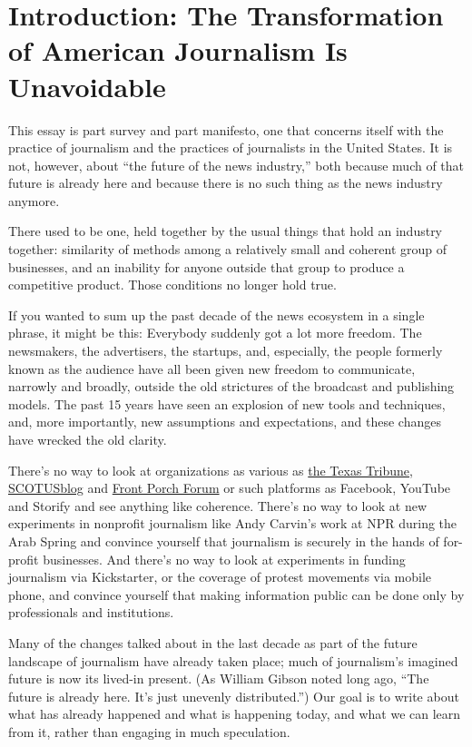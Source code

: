 \chapter{Introduction: The Transformation of American Journalism Is Unavoidable}

This essay is part survey and part manifesto, one that concerns itself with the practice
of journalism and the practices of journalists in the United States. It is not,
however, about ``the future of the news industry,'' both because much of that future
is already here and because there is no such thing as the news industry anymore.

There used to be one, held together by the usual things that hold an industry
together: similarity of methods among a relatively small and coherent group of
businesses, and an inability for anyone outside that group to produce a competitive
product. Those conditions no longer hold true.

If you wanted to sum up the past decade of the news ecosystem in a single phrase,
it might be this: Everybody suddenly got a lot more freedom. The newsmakers,
the advertisers, the startups, and, especially, the people formerly known as the
audience have all been given new freedom to communicate, narrowly and broadly,
outside the old strictures of the broadcast and publishing models. The past 15 years
have seen an explosion of new tools and techniques, and, more importantly, new
assumptions and expectations, and these changes have wrecked the old clarity.

There’s no way to look at organizations as various as \href{http://www.texastribune.org/}{the Texas Tribune},
\href{http://www.scotusblog.com/}{SCOTUSblog} and \href{http://frontporchforum.com/}{Front Porch Forum} or such platforms as Facebook, YouTube
and Storify and see anything like coherence. There’s no way to look at new
experiments in nonprofit journalism like Andy Carvin’s work at NPR during
the Arab Spring and convince yourself that journalism is securely in the hands
of for-profit businesses. And there’s no way to look at experiments in funding
journalism via Kickstarter, or the coverage of protest movements via mobile
phone, and convince yourself that making information public can be done only
by professionals and institutions.

Many of the changes talked about in the last decade as part of the future landscape
of journalism have already taken place; much of journalism’s imagined
future is now its lived-in present. (As William Gibson noted long ago, ``The
future is already here. It’s just unevenly distributed.'') Our goal is to write about
what has already happened and what is happening today, and what we can learn
from it, rather than engaging in much speculation.

